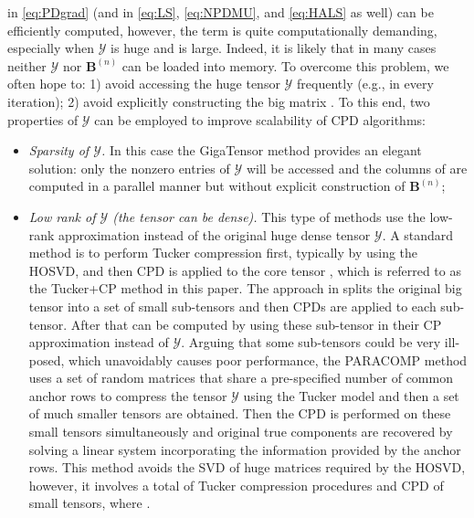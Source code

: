 \documentclass[10pt,twocolumn,twoside]{IEEEtran}
\newcommand{\tensor}[1]{\ensuremath{\boldsymbol{\mathscr{#1}}}}
\newcommand{\matn}[2][n]{\ensuremath{\mathbf{#2}^{(#1)}}}
\begin{document}
in \eqref{eq:PDgrad} (and in \eqref{eq:LS}, \eqref{eq:NPDMU}, and \eqref{eq:HALS} as well)  can be efficiently computed, however, the term  is quite computationally demanding, especially when \tensor{Y} is huge and  is large. Indeed, it is likely that in many cases neither \tensor{Y} nor \matn{B} can be loaded into memory. To overcome this problem, we often hope to: 1) avoid accessing the huge tensor \tensor{Y} frequently (e.g., in every iteration); 2) avoid explicitly constructing the big matrix . To this end, two properties of \tensor{Y} can be employed to improve scalability of CPD algorithms:
\begin{itemize}
\item
\emph{Sparsity of \tensor{Y}.} In this case the GigaTensor method \cite{GigaTensor} provides an elegant solution: only the nonzero entries of \tensor{Y} will be accessed and the columns of  are computed in a parallel manner but without explicit construction of \matn{B};

\item
\emph{Low rank of \tensor{Y} (the tensor can be dense).  }  This type of methods use the low-rank approximation instead of the original huge dense tensor \tensor{Y}.  A standard method is to perform Tucker compression first,  typically by using the HOSVD, and then CPD is applied to the core tensor \cite{BroTuckerPD}, which is referred to as the Tucker+CP method in this paper. The approach in \cite{gridPARAFAC} splits the original big tensor into a set of small sub-tensors and then CPDs are applied to each sub-tensor. After that  can be computed by using these sub-tensor in their CP approximation instead of \tensor{Y}. Arguing that some sub-tensors could be very ill-posed, which unavoidably causes poor performance, the PARACOMP method \cite{spm2014_paracomp} uses a set of random matrices that share a pre-specified number of common anchor rows to compress the tensor \tensor{Y} using the Tucker model and then a set of much smaller tensors are obtained. Then the CPD is performed on these small tensors simultaneously and original true components are recovered by solving a linear system incorporating the information provided by the anchor rows. This method avoids the SVD of huge matrices required by the HOSVD, however, it involves a total of   Tucker compression procedures and CPD of  small tensors, where  .
\end{itemize}
\end{document}
